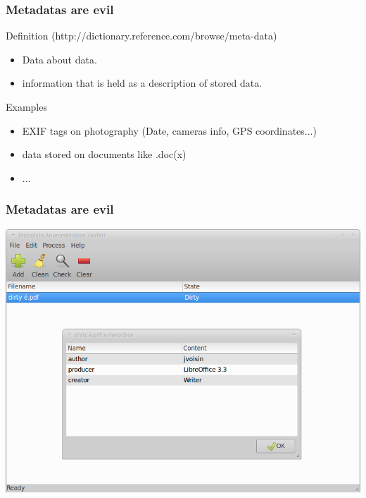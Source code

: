 \begin{frame}
\frametitle{Metadatas are evil}
\begin{block}{Definition (http://dictionary.reference.com/browse/meta-data)}
\begin{itemize}
\item Data about data.
\item information that is held as a description of stored data.
\end{itemize}
\end{block}
\begin{block}{Examples}
\begin{itemize}
\item EXIF tags on photography (Date, cameras info, GPS coordinates...)
\item data stored on documents like .doc(x)
\item ...
\end{itemize}
\end{block}
\end{frame}


\begin{frame}
\frametitle{Metadatas are evil}
\begin{center}
\includegraphics[scale=0.4] {./materials/Mat.png} 
\end{center}
\end{frame}

